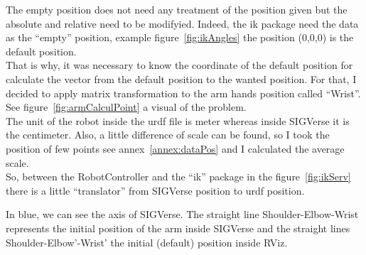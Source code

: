 The empty position does not need any treatment of the position given but the absolute and relative need to be modifyied. Indeed, the ik package need the data as the ``empty'' position, example figure~\ref{fig:ikAngles} the position (0,0,0) is the default position.\\
That is why, it was necessary to know the coordinate of the default position for calculate the vector from the default position to the wanted position. For that, I decided to apply matrix transformation to the arm hands position called ``Wrist''. See figure~\ref{fig:armCalculPoint} a visual of the problem.\\

The unit of the robot inside the urdf file is meter whereas inside SIGVerse it is the centimeter. Also, a little difference of scale can be found, so I took the position of few points see annex~\ref{annex:dataPos} and I calculated the average scale.\\
So, between the RobotController and the ``ik'' package in the figure~\ref{fig:ikServ} there is a little ``translator'' from SIGVerse position to urdf position.

\noindent\begin{minipage}{\linewidth}%
\label{fig:armCalculPoint}%
\end{minipage}

In blue, we can see the axis of SIGVerse. The straight line Shoulder-Elbow-Wrist represents the initial position of the arm inside SIGVerse and the straight lines Shoulder-Elbow'-Wrist' the initial (default) position inside RViz.\\

